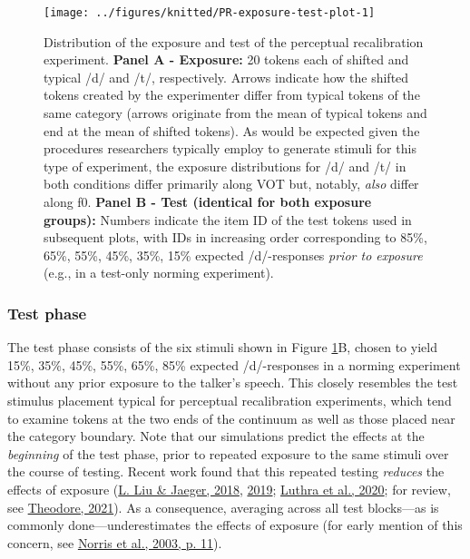 \documentclass[
  11pt,
  english,
  man,floatsintext]{apa6}
\begin{document}
\begin{figure}

{\centering \texttt{[image: ../figures/knitted/PR-exposure-test-plot-1]} 

}

\caption{Distribution of the exposure and test of the perceptual recalibration experiment. \textbf{Panel A - Exposure:} 20 tokens each of shifted and typical /d/ and /t/, respectively. Arrows indicate how the shifted tokens created by the experimenter differ from typical tokens of the same category (arrows originate from the mean of typical tokens and end at the mean of shifted tokens). As would be expected given the procedures researchers typically employ to generate stimuli for this type of experiment, the exposure distributions for /d/ and /t/ in both conditions differ primarily along VOT but, notably, \emph{also} differ along f0. \textbf{Panel B - Test (identical for both exposure groups):} Numbers indicate the item ID of the test tokens used in subsequent plots, with IDs in increasing order corresponding to 85\%, 65\%, 55\%, 45\%, 35\%, 15\% expected /d/-responses \emph{prior to exposure} (e.g., in a test-only norming experiment).}\label{fig:PR-exposure-test-plot}
\end{figure}

\hypertarget{test-phase}{%
\subsubsection{Test phase}\label{test-phase}}

The test phase consists of the six stimuli shown in Figure \ref{fig:PR-exposure-test-plot}B, chosen to yield 15\%, 35\%, 45\%, 55\%, 65\%, 85\% expected /d/-responses in a norming experiment without any prior exposure to the talker's speech. This closely resembles the test stimulus placement typical for perceptual recalibration experiments, which tend to examine tokens at the two ends of the continuum as well as those placed near the category boundary. Note that our simulations predict the effects at the \emph{beginning} of the test phase, prior to repeated exposure to the same stimuli over the course of testing. Recent work found that this repeated testing \emph{reduces} the effects of exposure (\protect\hyperlink{ref-liu-jaeger2018}{L. Liu \& Jaeger, 2018}, \protect\hyperlink{ref-liu-jaeger2019}{2019}; \protect\hyperlink{ref-luthra2020}{Luthra et al., 2020}; for review, see \protect\hyperlink{ref-theodore2021}{Theodore, 2021}). As a consequence, averaging across all test blocks---as is commonly done---underestimates the effects of exposure (for early mention of this concern, see \protect\hyperlink{ref-norris2003}{Norris et al., 2003, p. 11}).
\end{document}
